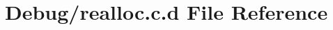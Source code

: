 \hypertarget{_debug_2realloc_8c_8d}{\section{\-Debug/realloc.c.\-d \-File \-Reference}
\label{_debug_2realloc_8c_8d}
}
